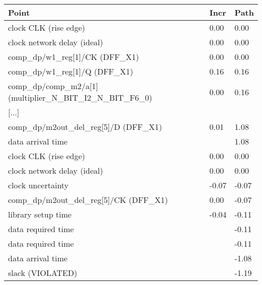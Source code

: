 \begin{tabular}{|lll|}  
	\hline
Point                                                  & Incr   &    Path\\\hline
  clock CLK (rise edge)                                  & 0.00   &    0.00\\
  clock network delay (ideal)                             &0.00   &    0.00\\
  comp\_dp/w1\_reg[1]/CK (DFF\_X1)                          & 0.00   &    0.00\\
  comp\_dp/w1\_reg[1]/Q (DFF\_X1)                            &0.16   &    0.16\\
  comp\_dp/comp\_m2/a[1] (multiplier\_N\_BIT\_I2\_N\_BIT\_F6\_0)   &0.00   &    0.16\\
  {[...]} & &\\
  comp\_dp/m2out\_del\_reg[5]/D (DFF\_X1)                     &0.01   &    1.08\\
  data arrival time                                      &     &       1.08\\
\hline
  clock CLK (rise edge)                                  & 0.00  &     0.00\\
  clock network delay (ideal)                           &  0.00   &    0.00\\
  clock uncertainty                                     & -0.07  &    -0.07\\
  comp\_dp/m2out\_del\_reg[5]/CK (DFF\_X1)                 &   0.00   &   -0.07\\
  library setup time                                   &  -0.04   &   -0.11\\
  data required time                                   &            & -0.11\\
\hline
  data required time                                    & &            -0.11\\
  data arrival time                                     & &            -1.08\\
\hline
  slack (VIOLATED)                                         & &         -1.19\\\hline
\end{tabular}